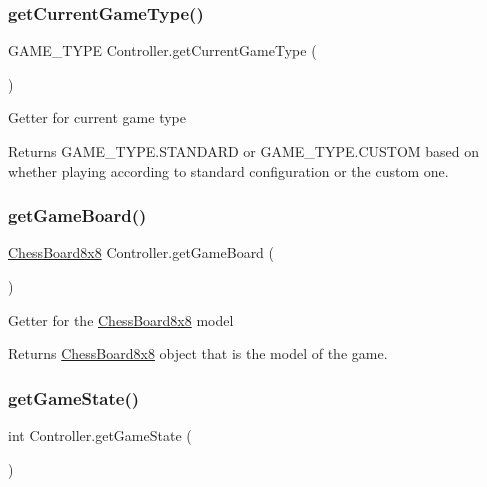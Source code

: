 \subsubsection{\texorpdfstring{get\+Current\+Game\+Type()}{getCurrentGameType()}}
{\footnotesize\ttfamily G\+A\+M\+E\+\_\+\+T\+Y\+PE Controller.\+get\+Current\+Game\+Type (\begin{DoxyParamCaption}{ }\end{DoxyParamCaption})}

Getter for current game type \begin{DoxyReturn}{Returns}
G\+A\+M\+E\+\_\+\+T\+Y\+P\+E.\+S\+T\+A\+N\+D\+A\+RD or G\+A\+M\+E\+\_\+\+T\+Y\+P\+E.\+C\+U\+S\+T\+OM based on whether playing according to standard configuration or the custom one. 
\end{DoxyReturn}
\mbox{\label{class_controller_a15e2c59414bfb52f5ba9b673fb4b93c2}} 
\subsubsection{\texorpdfstring{get\+Game\+Board()}{getGameBoard()}}
{\footnotesize\ttfamily \mbox{\hyperlink{class_chess_board8x8}{Chess\+Board8x8}} Controller.\+get\+Game\+Board (\begin{DoxyParamCaption}{ }\end{DoxyParamCaption})}

Getter for the \mbox{\hyperlink{class_chess_board8x8}{Chess\+Board8x8}} model \begin{DoxyReturn}{Returns}
\mbox{\hyperlink{class_chess_board8x8}{Chess\+Board8x8}} object that is the model of the game. 
\end{DoxyReturn}
\mbox{\label{class_controller_a27007d92148bf1197f4a3f0c11664505}} 
\subsubsection{\texorpdfstring{get\+Game\+State()}{getGameState()}}
{\footnotesize\ttfamily int Controller.\+get\+Game\+State (\begin{DoxyParamCaption}{ }\end{DoxyParamCaption})}

